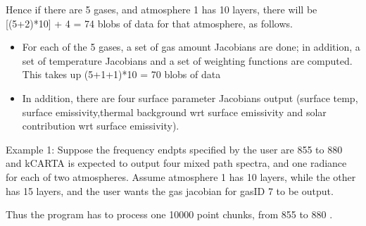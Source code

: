\documentclass[12pt]{article}
\newcommand{\kc}{\textsf{kCARTA}\xspace}
\begin{document}
{{{{\begin{itemize}
\end{itemize}

Hence if there are 5 gases, and atmosphere 1 has 10 layers, there will be
[(5+2)*10] + 4 = 74 blobs of data for that atmosphere, as follows.

\begin{itemize}
\item
  For each of the 5 gases, a set of gas amount Jacobians are done; in
  addition, a set of temperature Jacobians and a set of weighting
  functions are computed.  This takes up (5+1+1)*10 = 70 blobs of
  data
\item
  In addition, there are four surface parameter Jacobians output
  (surface temp, surface emissivity,thermal background wrt surface
  emissivity and solar contribution wrt surface emissivity).
\end{itemize}


Example 1: Suppose the frequency endpts specified by the 
user are 855 to 880 \wn and \kc is expected to output four mixed path 
spectra, and one radiance for each of two atmospheres. Assume atmosphere 1 
has 10 layers, while the other has 15 layers, and the user wants the gas 
jacobian for gasID 7 to be output.

Thus the program has to process one 10000 point chunks, from 
855 to 880 \wn.

}}}}
\end{document}
